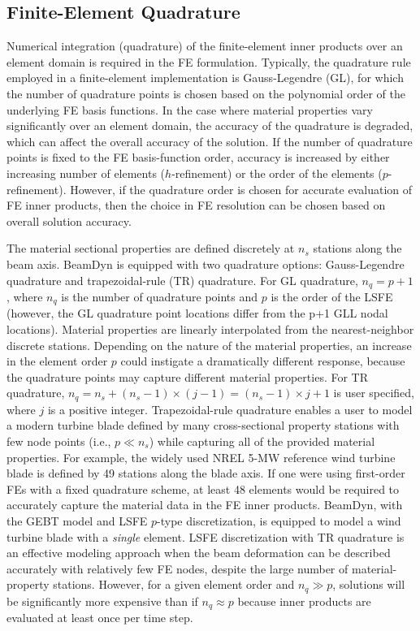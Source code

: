 \documentclass{aiaa-tc}
\begin{document}
\subsection{Finite-Element Quadrature}

Numerical integration (quadrature) of the finite-element inner products over an element domain is required in the FE formulation.   
Typically, the quadrature rule employed in a finite-element implementation is Gauss-Legendre (GL), for which the number of quadrature points is chosen based on the polynomial order of the underlying FE basis functions.  
In the case where material properties vary significantly over an element domain, the accuracy of the quadrature is degraded, which can affect the overall accuracy of the solution.   If the number of quadrature points is fixed to the FE basis-function order, accuracy is increased by either increasing number of elements ($h$-refinement) or the order of the elements ($p$-refinement).  However, if the quadrature order is chosen for accurate evaluation of FE inner products, then the choice in FE resolution can be chosen based on overall solution accuracy.

The material sectional properties are defined discretely at $n_s$ stations along the beam axis.
BeamDyn is equipped with two quadrature options: Gauss-Legendre quadrature and trapezoidal-rule (TR) quadrature.  
For GL quadrature, $n_q= p + 1$, where $n_q$ is the number of quadrature points and $p$ is the order of the LSFE  (however, the GL quadrature point locations differ from the p+1 GLL nodal locations).  Material properties are linearly interpolated from the nearest-neighbor discrete stations. 
Depending on the nature of the material properties, an increase in the element order $p$ could instigate a dramatically different response, because the quadrature points may capture different material properties.
For TR quadrature, $n_q = n_s + (n_s-1) \times (j-1)
= ( n_s - 1 ) \times j + 1$ is user specified, where $j$ is a positive integer. 
Trapezoidal-rule quadrature enables a user to model a modern turbine blade defined by many cross-sectional property stations with few node points (i.e., $p \ll n_s$) while capturing all of the provided material properties.
For example, 
the widely used NREL 5-MW reference wind turbine blade is defined by 49 stations along the blade axis.   If one were using first-order FEs with a fixed quadrature scheme, at least 48 elements would be required to accurately capture the material data in the FE inner products.
BeamDyn, with the GEBT model and LSFE $p$-type discretization, is equipped to model a wind turbine blade with a \textit{single} element.  
LSFE discretization with TR quadrature 
is an effective modeling approach when the beam deformation can be described accurately with relatively few FE nodes, despite the large number of material-property stations.    However, for a given element order and $n_q \gg p$, solutions will be significantly more expensive than if $n_q \approx p$ because inner products are evaluated at least once per time step. 
\end{document}

